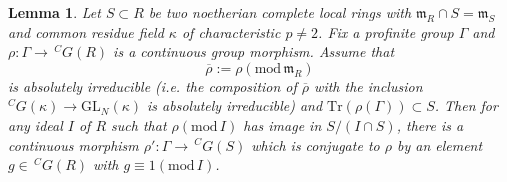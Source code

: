 \documentclass[12pt,oneside,reqno]{amsart}
\theoremstyle{plain}
\newtheorem{lemma}[theorem]{Lemma}
\begin{document}
	
	\begin{lemma}\label{lifting representations}
		Let
		$S\subset R$
		be two noetherian
		complete local rings
		with
		$\mathfrak{m}_R\cap S=\mathfrak{m}_S$
		and common residue field $\kappa$
		of characteristic
		$p\ne2$.
		Fix a profinite group
		$\Gamma$ and
		$\rho
		\colon
		\Gamma
		\rightarrow
		\,^CG(R)$
		is a continuous group morphism.
		Assume
		that
		\[
		\overline{\rho}:=\rho(\mathrm{mod}\,\mathfrak{m}_R)
		\]
		is absolutely irreducible
		(i.e. the composition of $\overline{\rho}$ with
		the inclusion
		$^CG(\kappa)\rightarrow\mathrm{GL}_N(\kappa)$
		is absolutely irreducible)
		and
		$\mathrm{Tr}(\rho(\Gamma))
		\subset S$.
		Then for any ideal
		$I$ of $R$
		such that
		$\rho(\mathrm{mod}\,I)$
		has image in
		$S/(I\cap S)$,
		there is a continuous morphism
		$\rho'
		\colon
		\Gamma
		\rightarrow
		\,^CG(S)$
		which is conjugate to
		$\rho$
		by an element
		$g\in\,^CG(R)$
		with
		$g\equiv1(\mathrm{mod}\,I)$.
	\end{lemma}
\end{document}
